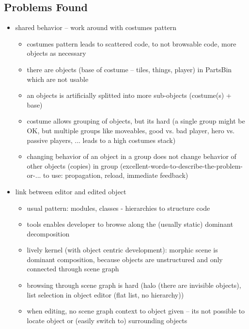 \subsection{Problems Found}
\begin{itemize}
 \item shared behavior -- work around with costumes pattern
 \begin{itemize}
  \item costumes pattern leads to scattered code, to not browsable code, more objects as necessary
  \item there are objects (base of costume -- tiles, things, player) in PartsBin which are not usable
  \item an objects is artificially splitted into more sub-objects (costume(s) + base)
  \item costume allows grouping of objects, but its hard (a single group might be OK, but multiple groups like moveables, good vs. bad player, hero vs. passive players, ... leads to a high costumes stack)
  \item changing behavior of an object in a group does not change behavior of other objects (copies) in group (excellent-words-to-describe-the-problem-or-... to use: propagation, reload, immediate feedback)
 \end{itemize}

 \item link between editor and edited object
 \begin{itemize}
  \item usual pattern: modules, classes - hierarchies to structure code
  \item tools enables developer to browse along the (usually static) dominant decomposition
  \item lively kernel (with object centric development): morphic scene is dominant composition, because objects are unstructured and only connected through scene graph
  \item browsing through scene graph is hard (halo (there are invisible objects), list selection in object editor (flat list, no hierarchy))
  \item when editing, no scene graph context to object given -- its not possible to locate object or (easily switch to) surrounding objects
 \end{itemize}

\end{itemize}

